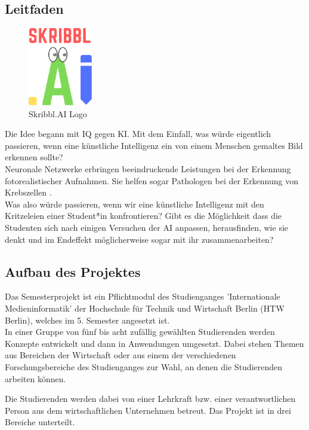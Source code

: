 \documentclass[11pt]{article}
\begin{document}
\subsection{Leitfaden}
\label{chap: leitfaden}
\begin{figure}
\centering
\includegraphics[width=0.25\textwidth]{images/logo_skribbl.png}
\caption{\label{fig:skribblLogo}Skribbl.AI Logo}
\end{figure}
Die Idee begann mit IQ gegen KI. Mit dem Einfall, was würde eigentlich passieren, wenn eine künstliche Intelligenz ein von einem Menschen gemaltes Bild  erkennen sollte? \\
Neuronale Netzwerke erbringen beeindruckende Leistungen bei der Erkennung fotorealistischer Aufnahmen. Sie helfen sogar Pathologen bei der Erkennung von Krebszellen \parencite{ElizabethDougherty2018}.\\
Was also würde  passieren, wenn wir eine künstliche Intelligenz mit den Kritzeleien einer Student*in konfrontieren? Gibt es die Möglichkeit dass die Studenten sich nach einigen Versuchen der AI anpassen, herausfinden, wie sie denkt und im Endeffekt möglicherweise sogar mit ihr zusammenarbeiten?
 
\subsection{Aufbau des Projektes}
\label{chap: Aufbau}

Das Semesterprojekt ist ein Pflichtmodul des Studienganges 'Internationale Medieninformatik' der Hochschule für Technik und Wirtschaft Berlin (HTW Berlin), welches im 5. Semester angesetzt ist. \\
In einer Gruppe von fünf bis acht zufällig gewählten Studierenden werden Konzepte entwickelt und dann in Anwendungen umgesetzt. Dabei stehen Themen aus Bereichen der Wirtschaft oder aus einem der verschiedenen Forschungsbereiche des Studienganges zur Wahl, an denen die Studierenden arbeiten können.

Die Studierenden werden dabei von einer Lehrkraft bzw. einer verantwortlichen Person aus dem wirtschaftlichen Unternehmen betreut.
Das Projekt ist in drei Bereiche unterteilt.
\end{document}

